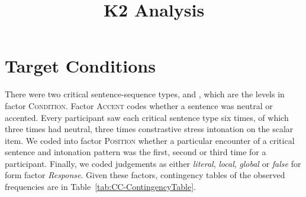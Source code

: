\documentclass[fleqn,reqno,10pt]{article}
\title{K2 Analysis}
\author{}
\date{}
\newcommand{\as}{\acro{as}}
\renewcommand{\es}{\acro{es}}
\begin{document}
\maketitle


\section{Target Conditions}
\label{sec:target-conditions}

There were two critical sentence-sequence types, \as and \es, which
are the levels in factor \textsc{Condition}. Factor \textsc{Accent}
codes whether a sentence was neutral or accented. Every participant
saw each critical sentence type six times, of which three times had
neutral, three times constrastive stress intonation on the scalar
item. We coded into factor \textsc{Position} whether a particular
encounter of a critical sentence and intonation pattern was the first,
second or third time for a participant. Finally, we coded judgements
as either \emph{literal}, \emph{local}, \emph{global} or \emph{false}
for form factor \emph{Response}. Given these factors, contingency
tables of the observed frequencies are in
Table~\ref{tab:CC-ContingencyTable}.
%
\end{document}
